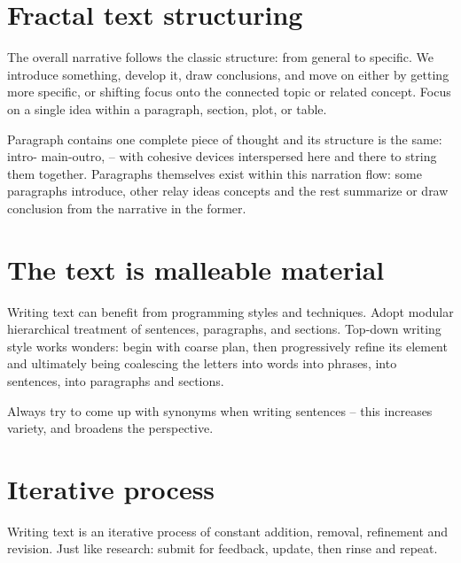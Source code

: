 \documentclass[10pt,a4paper,twocolumn]{article}
\begin{document}

\section{Fractal text structuring} %
\label{sec:fractal_text_structuring}

The overall narrative follows the classic structure: from general to specific. We introduce
something, develop it, draw conclusions, and move on either by getting more specific, or
shifting focus onto the connected topic or related concept. Focus on a single idea within
a paragraph, section, plot, or table.

Paragraph contains one complete piece of thought and its structure is the same: intro-%
main-outro, -- with cohesive devices interspersed here and there to string them together.
Paragraphs themselves exist within this narration flow: some paragraphs introduce, other
relay ideas concepts and the rest summarize or draw conclusion from the narrative in the
former.


\section{The text is malleable material} %
\label{sec:the_text_is_malleable_material}

Writing text can benefit from programming styles and techniques. Adopt modular hierarchical
treatment of sentences, paragraphs, and sections. Top-down writing style works wonders:
begin with coarse plan, then progressively refine its element and ultimately being
coalescing the letters into words into phrases, into sentences, into paragraphs and
sections.

Always try to come up with synonyms when writing sentences -- this increases variety,
and broadens the perspective.


\section{Iterative process} %
\label{sec:iterative_process}

Writing text is an iterative process of constant addition, removal, refinement and
revision. Just like research: submit for feedback, update, then rinse and repeat.
\end{document}
